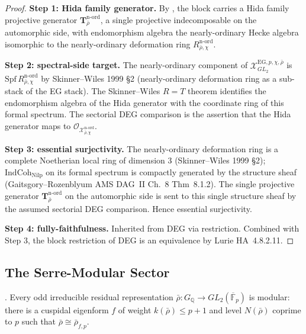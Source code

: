 \begin{proof}
\textbf{Step 1: Hida family generator.} By
, the block carries a Hida
family projective generator
\(\mathbf{T}_{\bar\rho}^{\mathrm{n\text{-}ord}}\), a single projective
indecomposable on the automorphic side, with endomorphism algebra
the nearly-ordinary Hecke algebra isomorphic to the
nearly-ordinary deformation ring \(R^{\mathrm{n\text{-}ord}}_{\bar\rho,\chi}\).

\textbf{Step 2: spectral-side target.} The nearly-ordinary
component of
\(\mathcal{X}^{\mathrm{EG},p,\chi,\bar\rho}_{GL_{2}}\) is
\(\mathrm{Spf}\,R^{\mathrm{n\text{-}ord}}_{\bar\rho,\chi}\) by
Skinner--Wiles 1999 \S 2 (nearly-ordinary deformation ring as a
sub-stack of the EG stack). The Skinner--Wiles \(R=T\) theorem
identifies the endomorphism algebra of the Hida generator with the
coordinate ring of this formal spectrum. The sectorial DEG comparison
is the assertion that the Hida generator maps to
\(\mathcal{O}_{\mathcal{X}^{\mathrm{n\text{-}ord}}_{\bar\rho,\chi}}\).

\textbf{Step 3: essential surjectivity.} The nearly-ordinary
deformation ring is a complete Noetherian local ring of dimension
\(3\) (Skinner--Wiles 1999 \S 2); \(\mathrm{IndCoh}_{\mathrm{Nilp}}\)
on its formal spectrum is compactly generated by the structure
sheaf (Gaitsgory--Rozenblyum AMS DAG~II Ch.~8 Thm~8.1.2). The single
projective generator \(\mathbf{T}_{\bar\rho}^{\mathrm{n\text{-}ord}}\)
on the automorphic side is sent to this single structure sheaf by the
assumed sectorial DEG comparison. Hence essential surjectivity.

\textbf{Step 4: fully-faithfulness.} Inherited from DEG via
restriction. Combined with Step 3, the block restriction of DEG is
an equivalence by Lurie HA~4.8.2.11.
\end{proof}

\subsection{The Serre-Modular Sector}

\begin{lemma}
\label{v4-arith:w6-e:lem:KW-Serre}
\ClaimStatusProvedElsewhere. Every odd irreducible residual
representation
\(\bar\rho\colon G_{\mathbb{Q}}\to GL_{2}(\overline{\mathbb{F}}_{p})\)
is modular: there is a cuspidal eigenform \(f\) of weight
\(k(\bar\rho)\leq p+1\) and level
\(N(\bar\rho)\) coprime to \(p\) such that \(\bar\rho\cong\bar\rho_{f,p}\).
\end{lemma}

